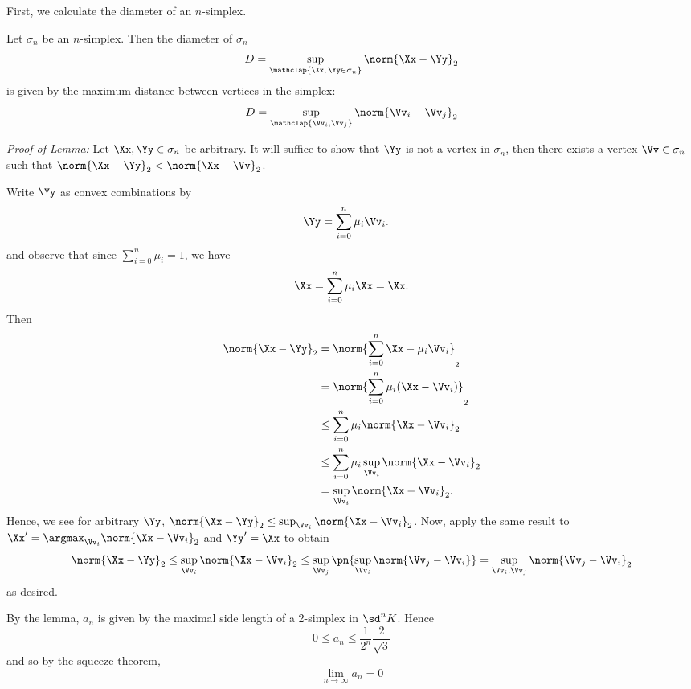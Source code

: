 \begin{solution}
  First, we calculate the diameter of an $n$-simplex.
  \begin{leftbar}
    \begin{lemma}
      Let $\sigma_n$ be an $n$-simplex. Then the diameter of $\sigma_n$
      \[
        D = \sup_{\mathclap{\Xx,\, \Yy \in \sigma_n}} \norm{\Xx - \Yy}_2
      \]
      is given by the maximum distance between vertices in the simplex:
      \[
        D = \sup_{\mathclap{\Vv_i, \Vv_j}} \norm{\Vv_i - \Vv_j}_2
      \]
    \end{lemma}

    \emph{Proof of Lemma:} Let $\Xx, \Yy \in \sigma_n$ be arbitrary. It will
    suffice to show that $\Yy$ is not a vertex in $\sigma_n$, then there exists
    a vertex $\Vv \in \sigma_n$ such that $\norm{\Xx - \Yy}_2 < \norm{\Xx -
      \Vv}_2$.

    Write $\Yy$ as convex combinations by
    \begin{align*}
      \Yy &= \sum_{i=0}^n \mu_i \Vv_i.
    \end{align*}
    and observe that since $\sum_{i=0}^n \mu_i = 1$, we have
    \[
      \Xx = \sum_{i=0}^n \mu_i \Xx = \Xx.
    \]
    Then
    \begin{align*}
      \norm{\Xx - \Yy}_2
      &= \norm{\sum_{i=0}^n \Xx - \mu_i\Vv_i}_2 \\
      &= \norm{\sum_{i=0}^n \mu_i(\Xx - \Vv_i)}_2 \\
      &\leq \sum_{i=0}^n \mu_i \norm{\Xx - \Vv_i}_2 \\
      &\leq \sum_{i=0}^n \mu_i \sup_{\Vv_i} \norm{\Xx - \Vv_i}_2 \\
      &= \sup_{\Vv_i} \norm{\Xx - \Vv_i}_2.
    \end{align*}
    Hence, we see for arbitrary $\Yy$, $\norm{\Xx - \Yy}_2 \leq \sup_{\Vv_i}
    \norm{\Xx - \Vv_i}_2$. Now, apply the same result to $\Xx' = \argmax_{\Vv_i}
    \norm{\Xx - \Vv_i}_2$ and $\Yy' = \Xx$ to obtain
    \[
      \norm{\Xx - \Yy}_2 \leq \sup_{\Vv_i} \norm{\Xx - \Vv_i}_2 \leq
      \sup_{\Vv_j}\pn{ \sup_{\Vv_i} \norm{\Vv_j - \Vv_i}} = \sup_{\Vv_i, \Vv_j}
      \norm{\Vv_j - \Vv_i}_2
    \]
    as desired.
  \end{leftbar}
  By the lemma, $a_n$ is given by the maximal side length of a 2-simplex in
  $\sd^n K$. Hence
  \[
    0 \leq a_n \leq \frac{1}{2^n} \frac{2}{\sqrt{3}}
  \]
  and so by the squeeze theorem,
  \[
    \lim_{n\to\infty} a_n = 0
  \]
\end{solution}


